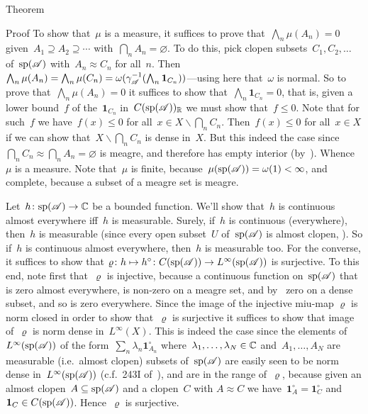 \documentclass[a]{subfiles}
\begin{document}
\begin{parsec}
\begin{point}{Theorem}
\begin{point}{Proof}
To show that~$\mu$
is a measure,
it suffices to prove
that~$\bigwedge_n \mu(A_n)=0$
given~$A_1\supseteq A_2\supseteq \dotsb$
with~$\bigcap_n A_n=\varnothing$.
To do this, pick clopen subsets~$C_1,C_2,\dotsc$
of~$\mathrm{sp}(\mathscr{A})$
with~$A_n\approx C_n$ for all~$n$.
Then~$\bigwedge_n \mu(A_n)
=\bigwedge_n \mu(C_n)
= \omega(\gamma_{\mathscr{A}}^{-1}(\bigwedge_n \mathbf{1}_{C_n}))$---using 
here that~$\omega$ is normal.
So to prove that~$\bigwedge_n \mu(A_n)=0$
it suffices to show that~$\bigwedge_n \mathbf{1}_{C_n}=0$,
that is,
given a lower bound~$f$ of the~$\mathbf{1}_{C_n}$
in~$C(\mathrm{sp}(\mathscr{A}))_{\mathbb{R}}$
we must show that~$f\leq 0$.
Note that for such~$f$
we have~$f(x)\leq 0$
for all~$x\in X\backslash\bigcap_n C_n$.
Then~$f(x)\leq 0$ for all~$x\in X$
if we can show that~$X\backslash \bigcap_n C_n$ is dense in~$X$.
But this indeed the case
since~$\bigcap_n C_n\approx \bigcap_n A_n=\varnothing$
is meagre, and therefore has empty interior
(by~).
Whence~$\mu$ is a measure.
Note that~$\mu$ is finite,
because~$\mu(\mathrm{sp}(\mathscr{A}))
= \omega(1)<\infty$,
and complete,
because a subset of a meagre set is meagre.

Let~$h\colon \mathrm{sp}(\mathscr{A})\to\mathbb{C}$ be a bounded function.
We'll show that~$h$ is continuous almost everywhere
iff~$h$ is measurable.
Surely,
if~$h$ is continuous (everywhere),
then~$h$ is measurable
(since every open subset~$U$ of~$\mathrm{sp}(\mathscr{A})$
is almost clopen, ).
So if~$h$ is continuous almost everywhere,
then~$h$ is measurable too.
For the converse,
it suffices to show
that $\varrho \colon h\mapsto h^\circ\colon C(\mathrm{sp}(\mathscr{A}))\to
L^\infty(\mathrm{sp}(\mathscr{A}))$ is surjective.
To this end, note first that~$\varrho$ is injective,
because a continuous function on~$\mathrm{sp}(\mathscr{A})$
that is zero almost everywhere,
is non-zero on a meagre set,
and by~ zero on a dense
subset, and so is zero everywhere.
Since the image of the injective miu-map $\varrho$ is norm closed
in order to show that~$\varrho$ is surjective
it suffices to show that image of~$\varrho$ is 
norm dense in~$L^\infty(X)$.
This is indeed the case
since the elements of~$L^\infty(\mathrm{sp}(\mathscr{A}))$
of the form~$\sum_{n} \lambda_n \mathbf{1}_{A_n}^\circ$
where~$\lambda_1,\dotsc,\lambda_N\in\mathbb{C}$
and~$A_1,\dotsc,A_N$ are measurable (i.e.~almost clopen)
subsets of~$\mathrm{sp}(\mathscr{A})$
are easily seen to be norm dense in~$L^\infty(\mathrm{sp}(\mathscr{A}))$
(c.f.~243I of~\cite{fremlin}),
and are in the range of~$\varrho$,
because given an almost clopen~$A\subseteq \mathrm{sp}(\mathscr{A})$
and a clopen~$C$ with $A\approx C$
we have~$\mathbf{1}_A^\circ = \mathbf{1}_C^\circ$
and~$\mathbf{1}_{C}\in C(\mathrm{sp}(\mathscr{A}))$.
Hence~$\varrho$ is surjective.


\end{point}
\end{point}
\end{parsec}
\end{document}
